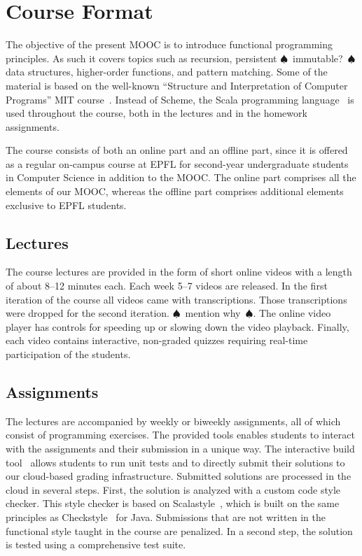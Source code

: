 \documentclass{sig-alternate}
\newcommand{\todo}[1]{$\spadesuit$~#1~$\spadesuit$}
\begin{document}
\section{Course Format}

The objective of the present MOOC is to introduce functional programming
principles. As such it covers topics such as recursion, persistent \todo{immutable?} data
structures, higher-order functions, and pattern matching. Some of the material
is based on the well-known ``Structure and Interpretation of Computer
Programs'' MIT course~\cite{Abelson85}. Instead of Scheme, the Scala
programming language~\cite{Odersky-Spoon-Venners07} is used throughout the
course, both in the lectures and in the homework assignments.

The course consists of both an online part and an offline part, since it is
offered as a regular on-campus course at EPFL for second-year undergraduate
students in Computer Science in addition to the MOOC. The online part
comprises all the elements of our MOOC, whereas the offline part comprises
additional elements exclusive to EPFL students.

\subsection{Lectures}\label{sec:mooc-elements}

The course lectures are provided in the form of short
online videos with a length of about 8--12 minutes each. Each week 5--7
videos are released. In the first iteration of the course all videos came with
transcriptions. Those transcriptions were dropped for the second iteration.
\todo{mention why}.
The online video player has controls for speeding up or slowing down the video
playback. Finally, each video contains interactive, non-graded
quizzes requiring real-time participation of the students.

\subsection{Assignments}

The lectures are accompanied by weekly or biweekly assignments, all of which
consist of programming exercises. The provided tools enables students to
interact with the assignments and their submission in a unique way. The
interactive build tool~\cite{sbt} allows students to run unit tests and to
directly submit their solutions to our cloud-based grading infrastructure.
Submitted solutions are processed in the cloud in several steps. First, the
solution is analyzed with a custom code style checker. This style checker is based
on Scalastyle~\cite{ScalaStyle}, which is built on the same principles as
Checkstyle~\cite{Ware08} for Java. Submissions that are not written in the
functional style taught in the course are penalized. In a second step,
the solution is tested using a comprehensive test suite.
\end{document}

